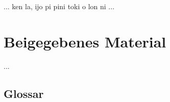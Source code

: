 \documentclass[
	12pt,
	ngerman,
]{scrartcl}
\newcommand{\zwsp}{\mbox{​}} %
\newcommand{\ayr}[1]{\zwsp\smash{{\Tagati #1}}} %
\begin{document}
... ken la, ijo pi pini toki o lon ni ...


\section{Beigegebenes Material}
\label{sec:suppl}

...

\subsection{Glossar}

\begin{multicols}{2}
\raggedright
\begin{description}[nosep]


\end{description}
\end{multicols}
\end{document}
